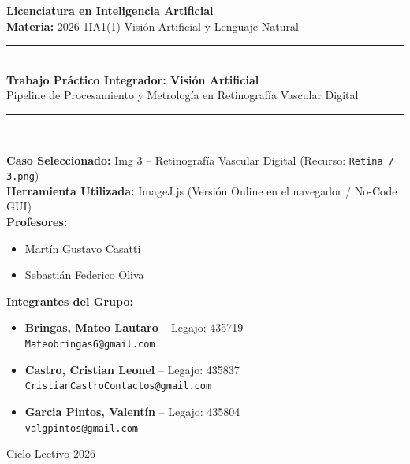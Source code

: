 \documentclass[11pt,a4paper]{article}
\begin{document}
\thispagestyle{empty}
\begin{center}
    \vspace*{1.0cm}
    {\Large \textbf{Licenciatura en Inteligencia Artificial}}\\[0.3cm]
    {\large \textbf{Materia:} 2026-1IA1(1) Visión Artificial y Lenguaje Natural}\\[1.5cm]
    
    \rule{\linewidth}{0.5mm} \\[0.4cm]
    {\LARGE \textbf{Trabajo Práctico Integrador: Visión Artificial}}\\[0.3cm]
    {\Large Pipeline de Procesamiento y Metrología en Retinografía Vascular Digital}\\[0.2cm]
    \rule{\linewidth}{0.5mm} \\[1.5cm]

    \begin{minipage}{0.85\textwidth}
        \textbf{Caso Seleccionado:} Img 3 -- Retinografía Vascular Digital (Recurso: \texttt{Retina / 3.png})\\[0.4cm]
        \textbf{Herramienta Utilizada:} ImageJ.js (Versión Online en el navegador / No-Code GUI)\\[0.6cm]
        \textbf{Profesores:}
        \begin{itemize}
            \item Martín Gustavo Casatti
            \item Sebastián Federico Oliva
        \end{itemize}
        \vspace{0.3cm}
        \textbf{Integrantes del Grupo:}
        \begin{itemize}
            \item \textbf{Bringas, Mateo Lautaro} -- Legajo: 435719 \\ \texttt{Mateobringas6@gmail.com}
            \item \textbf{Castro, Cristian Leonel} -- Legajo: 435837 \\ \texttt{CristianCastroContactos@gmail.com}
            \item \textbf{Garcia Pintos, Valentín} -- Legajo: 435804 \\ \texttt{valgpintos@gmail.com}
        \end{itemize}
    \end{minipage}

    \vfill
    {\large Ciclo Lectivo 2026}
\end{center}
\end{document}
